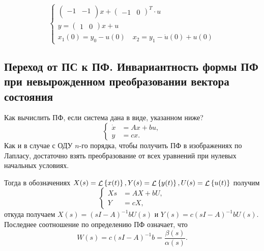 \documentclass[../../TAU.tex]{subfiles}
\begin{document}
{$$\begin{cases}
\begin{pmatrix}
                    -1 & -1 \\
                \end{pmatrix}
                x+
                \begin{pmatrix}
                    -1 & 0
                \end{pmatrix}^T
                \cdot u          \\
                y = 
                \begin{pmatrix}
                    1 & 0
                \end{pmatrix}
                x + u            \\
                x_1(0)=y_0-u(0)\quad x_2=y_1-\dot u(0)+u(0)
            \end{cases}        
        $$
    }

\subsection{Переход от ПС к ПФ. Инвариантность формы 
ПФ при невырожденном преобразовании вектора состояния}

    Как вычислить ПФ, если система дана в виде, указанном ниже?
    $$
        \left\{
        \begin{aligned}
            \dot x &= Ax+bu,\\
            y&= cx.
        \end{aligned}
        \right.
    $$
    Как и в случае с ОДУ $n$-го порядка, чтобы получить ПФ в изображениях по Лапласу, достаточно взять преобразование от всех уравнений при нулевых начальных условиях. 
    \pagebreak

    Тогда в обозначениях 
    ${X(s)=\mathop{\mathcal{L}}\nolimits\left\{x(t)\right\}, Y(s)=\mathop{\mathcal{L}}\nolimits\left\{y(t)\right\}, U(s) = \mathop{\mathcal{L}}\nolimits\left\{u(t)\right\}}$ 
    получим
    $$
        \left\{
        \begin{aligned}
            Xs &= AX+bU,\\
            Y &= cX,
        \end{aligned}
        \right.
    $$
    откуда получаем 
    ${X(s) = (sI-A)^{-1}b U(s)}$ 
    и 
    ${Y(s) = c(sI-A)^{-1}b U(s)}$. 
    Последнее соотношение по определению ПФ означает, что
    $$
        W(s) = c (sI-A)^{-1}b = \frac{\beta(s)}{\alpha(s)}.
    $$
\end{document}
